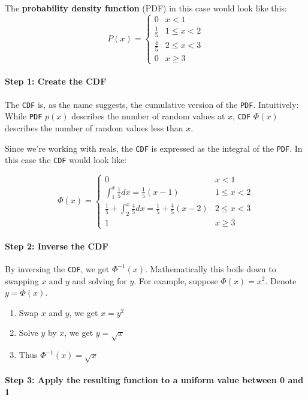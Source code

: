 The \textbf{probability density function} (PDF) in this case would look like this:
\[
P(x) = 
\begin{cases}
0  &  x < 1 \\
\frac{1}{5}  & 1\leq x<2 \\
\frac{4}{5} & 2\leq x <3 \\
0 & x\geq 3
\end{cases}
\]

\paragraph{Step 1: Create the CDF}


The \texttt{CDF} is, as the name suggests, the cumulative version of the \texttt{PDF}. Intuitively: While \texttt{PDF} $p(x)$ describes the number of random values at $x$, \texttt{CDF} $\Phi(x)$ describes the number of random values less than $x$.

Since we're working with reals, the \texttt{CDF} is expressed as the integral of the \texttt{PDF}. In this case the \texttt{CDF} would look like:

\[
\Phi(x) = 
\begin{cases}
0 & x < 1 \\
\int_{1}^{x}\frac{1}{5}dx = \frac{1}{5}(x-1) & 1\leq x < 2 \\
\frac{1}{5} + \int_{2}^{x}\frac{4}{5}dx = \frac{1}{5} + \frac{4}{5}(x-2) & 2\leq x < 3 \\
1 & x \geq 3
\end{cases}
\]


\paragraph{Step 2: Inverse the CDF}

By inversing the \texttt{CDF}, we get $\Phi^{-1}(x)$. Mathematically this boils down to swapping $x$ and $y$ and solving for $y$. For example, suppose $\Phi(x) = x^2$. Denote $y=\Phi(x)$. 

\begin{enumerate}
\item Swap $x$ and $y$, we get $x=y^2$
\item Solve $y$ by $x$, we get $y=\sqrt{x}$
\item Thus $\Phi^{-1}(x) = \sqrt{x}$
\end{enumerate}


\paragraph{Step 3: Apply the resulting function to a uniform value between 0 and 1}

